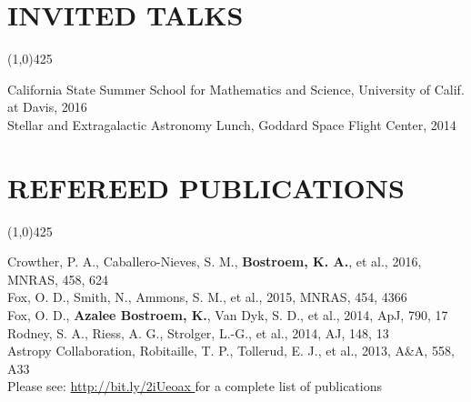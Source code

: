 \documentclass{res}
\begin{document}
\begin{resume}
\section{INVITED TALKS}
\vspace{-.2in} 
\begin{center}
\line(1,0){425}
\end{center}
\vspace{-.25in} 
\vspace{0.1in}
California State Summer School for Mathematics and Science, University of Calif. at Davis, 2016\\
Stellar and Extragalactic Astronomy Lunch, Goddard Space Flight Center, 2014
%
\section{REFEREED PUBLICATIONS}
\vspace{-.2in} 
\begin{center}
\line(1,0){425}
\end{center}
\vspace{-.25in} 
\vspace{0.1in}
Crowther, P. A., Caballero-Nieves, S. M., {\bf Bostroem, K. A.}, et al., 2016, MNRAS, 458, 624\\
Fox, O. D., Smith, N., Ammons, S. M., et al., 2015, MNRAS, 454, 4366\\
Fox, O. D., {\bf Azalee Bostroem, K.}, Van Dyk, S. D., et al., 2014, ApJ, 790, 17\\
Rodney, S. A., Riess, A. G., Strolger, L.-G., et al., 2014, AJ, 148, 13\\
Astropy Collaboration, Robitaille, T. P., Tollerud, E. J., et al., 2013, A\&A, 558, A33 \\
Please see: \color{blue}\url{http://bit.ly/2iUeoax }\color{black}\hspace*{0pt} for a complete list of publications 
%

\end{resume}
\end{document}
